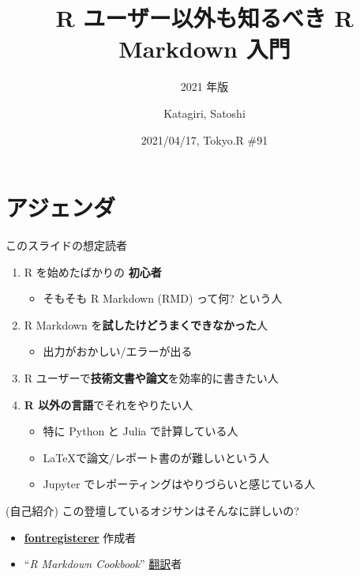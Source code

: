 \documentclass[
  ignorenonframetext,
]{beamer}
\title{R ユーザー以外も知るべき R Markdown 入門}
\subtitle{2021 年版}
\author{Katagiri, Satoshi}
\date{2021/04/17, Tokyo.R \#91}
\providecommand{\tightlist}{%
  \setlength{\itemsep}{0pt}\setlength{\parskip}{0pt}}
\begin{document}
\frame{\titlepage}

\hypertarget{ux30a2ux30b8ux30a7ux30f3ux30c0}{%
\section{アジェンダ}\label{ux30a2ux30b8ux30a7ux30f3ux30c0}}

\begin{frame}{このスライドの想定読者}
\protect\hypertarget{ux3053ux306eux30b9ux30e9ux30a4ux30c9ux306eux60f3ux5b9aux8aadux8005}{}
\begin{enumerate}
\item
  R を始めたばかりの \textbf{初心者}

  \begin{itemize}
  \tightlist
  \item
    そもそも R Markdown (RMD) って何? という人
  \end{itemize}
\item
  R Markdown を\textbf{試したけどうまくできなかった}人

  \begin{itemize}
  \tightlist
  \item
    出力がおかしい/エラーが出る
  \end{itemize}
\item
  R ユーザーで\textbf{技術文書や論文}を効率的に書きたい人
\item
  \textbf{R 以外の言語}でそれをやりたい人

  \begin{itemize}
  \tightlist
  \item
    特に Python と Julia で計算している人
  \item
    \LaTeX で論文/レポート書のが難しいという人
  \item
    Jupyter でレポーティングはやりづらいと感じている人
  \end{itemize}
\end{enumerate}
\end{frame}

\begin{frame}{(自己紹介) この登壇しているオジサンはそんなに詳しいの?}
\protect\hypertarget{ux81eaux5df1ux7d39ux4ecb-ux3053ux306eux767bux58c7ux3057ux3066ux3044ux308bux30aaux30b8ux30b5ux30f3ux306fux305dux3093ux306aux306bux8a73ux3057ux3044ux306e}{}
\begin{itemize}
\tightlist
\item
  \href{https://github.com/Gedevan-Aleksizde/fontregisterer}{\textbf{fontregisterer}} 作成者
\item
  ``\emph{R Markdown Cookbook}''
  \href{https://gedevan-aleksizde.github.io/rmarkdown-cookbook/}{翻訳}者
\end{itemize}
\end{frame}
\end{document}
